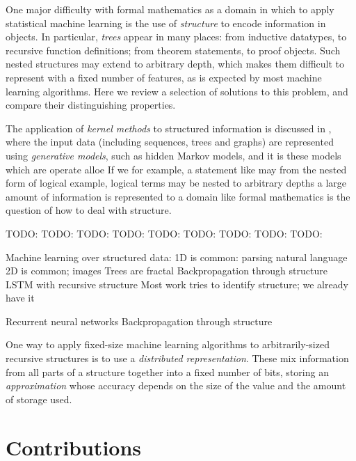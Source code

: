 \documentclass[]{article}
\begin{document}
One major difficulty with formal mathematics as a domain in which to apply statistical machine learning is the use of \emph{structure} to encode information in objects. In particular, \emph{trees} appear in many places: from inductive datatypes, to recursive function definitions; from theorem statements, to proof objects. Such nested structures may extend to arbitrary depth, which makes them difficult to represent with a fixed number of features, as is expected by most machine learning algorithms. Here we review a selection of solutions to this problem, and compare their distinguishing properties.

The application of \emph{kernel methods} to structured information is discussed in \cite{Gartner2003}, where the input data (including sequences, trees and graphs) are represented using \emph{generative models}, such as hidden Markov models, and it is these models which are
operate alloe If we for example, a statement like may from the nested form of logical  example, logical terms may be nested to arbitrary depths a large amount of information is represented   to a domain like formal mathematics is the question of how to deal with structure.


TODO: \cite{Gartner2003}
TODO: \cite{Oveisi.Oveisi.Erfanian.ea:2012}
TODO: \cite{bakir2007predicting}
TODO: \cite{conf/ijcai/Plate91}
TODO: \cite{goller1996learning}
TODO: \cite{kwasny1995tail}
TODO: \cite{pollack1990recursive}
TODO: \cite{zanzotto2012distributed}
TODO: \cite{zzzzzba6c2484534f9d1105400e6d693a1d3b}

Machine learning over structured data:
1D is common: parsing natural language
2D is common; images
Trees are fractal
Backpropagation through structure
LSTM with recursive structure
Most work tries to identify structure; we already have it

Recurrent neural networks
Backpropagation through structure

One way to apply fixed-size machine learning algorithms to arbitrarily-sized recursive structures is to use a \emph{distributed representation}. These mix information from all parts of a structure together into a fixed number of bits, storing an \emph{approximation} whose accuracy depends on the size of the value and the amount of storage used.

\section{Contributions}
\label{current}
\end{document}
